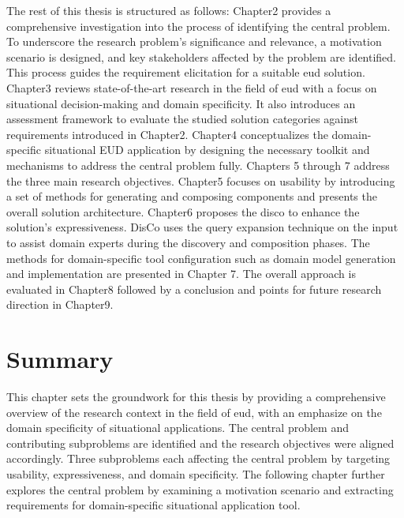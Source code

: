 The rest of this thesis is structured as follows: Chapter2 provides a comprehensive investigation into the process of identifying the central problem. To underscore the research problem's significance and relevance, a motivation scenario is designed, and key stakeholders affected by the problem are identified. This process guides the requirement elicitation for a  suitable \gls{eud} solution. Chapter3 reviews state-of-the-art research in the field of \gls{eud} with a focus on situational decision-making and domain specificity. It also introduces an assessment framework to evaluate the studied solution categories against requirements introduced in Chapter2. Chapter4 conceptualizes the domain-specific situational EUD application by designing the necessary toolkit and mechanisms to address the central problem fully. Chapters 5 through 7 address the three main research objectives. Chapter5 focuses on usability by introducing a set of methods for generating and composing components and presents the overall solution architecture. Chapter6 proposes the \gls{disco} to enhance the solution's expressiveness. DisCo uses the query expansion technique on the input to assist domain experts during the discovery and composition phases. The methods for domain-specific tool configuration such as domain model generation and implementation are presented in Chapter 7. The overall approach is evaluated in Chapter8 followed by a conclusion and points for future research direction in  Chapter9.


\pagebreak

\vspace{-15pt}
\hypertarget{summary}{%
\section{Summary}\label{summary}}
\vspace{15pt}

This chapter sets the groundwork for this thesis by providing a comprehensive overview of the research context in the field of \gls{eud}, with an emphasize on the domain specificity of situational applications. The central problem and contributing subproblems are identified and the research objectives were aligned accordingly. Three subproblems each affecting the central problem by targeting usability, expressiveness, and domain specificity. The following chapter further explores the central problem by examining a motivation scenario and extracting requirements for domain-specific situational application tool. 